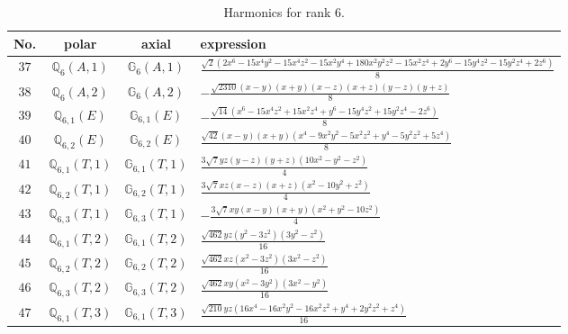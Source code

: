 \documentclass[fleqn,8pt,landscape]{jsarticle}
\begin{document}
\begin{table}[ht!]
\begin{center}
\caption{Harmonics for rank 6.}
\renewcommand{\arraystretch}{1.3}
\begin{tabular}{cccl} \hline \hline
No. & polar & axial & expression \\ \hline
$ 37 $ & $ \mathbb{Q}_{6}(A,1) $ & $ \mathbb{G}_{6}(A,1) $ & $ \frac{\sqrt{2} \left(2 x^{6} - 15 x^{4} y^{2} - 15 x^{4} z^{2} - 15 x^{2} y^{4} + 180 x^{2} y^{2} z^{2} - 15 x^{2} z^{4} + 2 y^{6} - 15 y^{4} z^{2} - 15 y^{2} z^{4} + 2 z^{6}\right)}{8} $ \\
$ 38 $ & $ \mathbb{Q}_{6}(A,2) $ & $ \mathbb{G}_{6}(A,2) $ & $ - \frac{\sqrt{2310} \left(x - y\right) \left(x + y\right) \left(x - z\right) \left(x + z\right) \left(y - z\right) \left(y + z\right)}{8} $ \\
$ 39 $ & $ \mathbb{Q}_{6,1}(E) $ & $ \mathbb{G}_{6,1}(E) $ & $ - \frac{\sqrt{14} \left(x^{6} - 15 x^{4} z^{2} + 15 x^{2} z^{4} + y^{6} - 15 y^{4} z^{2} + 15 y^{2} z^{4} - 2 z^{6}\right)}{8} $ \\
$ 40 $ & $ \mathbb{Q}_{6,2}(E) $ & $ \mathbb{G}_{6,2}(E) $ & $ \frac{\sqrt{42} \left(x - y\right) \left(x + y\right) \left(x^{4} - 9 x^{2} y^{2} - 5 x^{2} z^{2} + y^{4} - 5 y^{2} z^{2} + 5 z^{4}\right)}{8} $ \\
$ 41 $ & $ \mathbb{Q}_{6,1}(T,1) $ & $ \mathbb{G}_{6,1}(T,1) $ & $ \frac{3 \sqrt{7} y z \left(y - z\right) \left(y + z\right) \left(10 x^{2} - y^{2} - z^{2}\right)}{4} $ \\
$ 42 $ & $ \mathbb{Q}_{6,2}(T,1) $ & $ \mathbb{G}_{6,2}(T,1) $ & $ \frac{3 \sqrt{7} x z \left(x - z\right) \left(x + z\right) \left(x^{2} - 10 y^{2} + z^{2}\right)}{4} $ \\
$ 43 $ & $ \mathbb{Q}_{6,3}(T,1) $ & $ \mathbb{G}_{6,3}(T,1) $ & $ - \frac{3 \sqrt{7} x y \left(x - y\right) \left(x + y\right) \left(x^{2} + y^{2} - 10 z^{2}\right)}{4} $ \\
$ 44 $ & $ \mathbb{Q}_{6,1}(T,2) $ & $ \mathbb{G}_{6,1}(T,2) $ & $ \frac{\sqrt{462} y z \left(y^{2} - 3 z^{2}\right) \left(3 y^{2} - z^{2}\right)}{16} $ \\
$ 45 $ & $ \mathbb{Q}_{6,2}(T,2) $ & $ \mathbb{G}_{6,2}(T,2) $ & $ \frac{\sqrt{462} x z \left(x^{2} - 3 z^{2}\right) \left(3 x^{2} - z^{2}\right)}{16} $ \\
$ 46 $ & $ \mathbb{Q}_{6,3}(T,2) $ & $ \mathbb{G}_{6,3}(T,2) $ & $ \frac{\sqrt{462} x y \left(x^{2} - 3 y^{2}\right) \left(3 x^{2} - y^{2}\right)}{16} $ \\
$ 47 $ & $ \mathbb{Q}_{6,1}(T,3) $ & $ \mathbb{G}_{6,1}(T,3) $ & $ \frac{\sqrt{210} y z \left(16 x^{4} - 16 x^{2} y^{2} - 16 x^{2} z^{2} + y^{4} + 2 y^{2} z^{2} + z^{4}\right)}{16} $ \\

\end{tabular}
\end{center}
\end{table}
\end{document}
